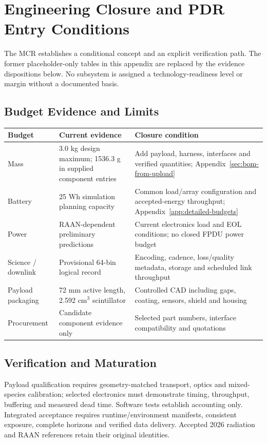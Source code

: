 \section{Engineering Closure and PDR Entry Conditions}\label{app:source-05}
The MCR establishes a conditional concept and an explicit verification path. The former placeholder-only tables in this appendix are replaced by the evidence dispositions below. No subsystem is assigned a technology-readiness level or margin without a documented basis.

\subsection{Budget Evidence and Limits}
\begin{table}[H]\centering\small
\begin{tabularx}{\linewidth}{@{}p{3cm}p{4cm}X@{}}\toprule
Budget & Current evidence & Closure condition\\\midrule
Mass & 3.0 kg design maximum; 1536.3 g in supplied component entries & Add payload, harness, interfaces and verified quantities; Appendix~\ref{sec:bom-from-upload}\\
Battery & 25 Wh simulation planning capacity & Common load/array configuration and accepted-energy throughput; Appendix~\ref{app:detailed-budgets}\\
Power & RAAN-dependent preliminary predictions & Current electronics load and EOL conditions; no closed FPDU power budget\\
Science / downlink & Provisional 64-bin logical record & Encoding, cadence, loss/quality metadata, storage and scheduled link throughput\\
Payload packaging & 72 mm active length, 2.592 cm$^3$ scintillator & Controlled CAD including gaps, coating, sensors, shield and housing\\
Procurement & Candidate component evidence only & Selected part numbers, interface compatibility and quotations\\\bottomrule
\end{tabularx}\end{table}

\subsection{Verification and Maturation}
Payload qualification requires geometry-matched transport, optics and mixed-species calibration; selected electronics must demonstrate timing, throughput, buffering and measured dead time. Software tests establish accounting only. Integrated acceptance requires runtime/environment manifests, consistent exposure, complete horizons and verified data delivery. Accepted 2026 radiation and RAAN references retain their original identities.

